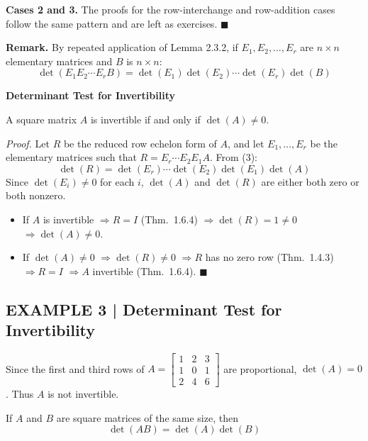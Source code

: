 \documentclass{article}
\newcommand{\redheading}[1]{{\vspace{2mm}\noindent\Large\bfseries\color{red!55!black} #1\par}\vspace{2mm}}
\theoremstyle{mystyle}
\begin{document}
\textbf{Cases 2 and 3.} The proofs for the row-interchange and row-addition cases
follow the same pattern and are left as exercises. $\blacksquare$

\textbf{Remark.} By repeated application of Lemma 2.3.2, if $E_1,E_2,\ldots,E_r$
are $n\times n$ elementary matrices and $B$ is $n\times n$:
\begin{equation}
\det(E_1 E_2\cdots E_r B)=\det(E_1)\det(E_2)\cdots\det(E_r)\det(B) \tag{3}
\end{equation}

\redheading{Determinant Test for Invertibility}

\begin{tcolorbox}[colback=red!4, colframe=red!60!black,
  title={\textbf{Theorem 2.3.3}}, boxrule=0.5mm, arc=3mm]
A square matrix $A$ is invertible if and only if $\det(A)\neq 0$.
\end{tcolorbox}

\textit{Proof.} Let $R$ be the reduced row echelon form of $A$, and let
$E_1,\ldots,E_r$ be the elementary matrices such that $R=E_r\cdots E_2 E_1 A$.
From (3):
\begin{equation}
\det(R)=\det(E_r)\cdots\det(E_2)\det(E_1)\det(A) \tag{4}
\end{equation}
Since $\det(E_i)\neq 0$ for each $i$, $\det(A)$ and $\det(R)$ are either both zero or
both nonzero.

\begin{itemize}
  \item If $A$ is invertible $\Rightarrow R=I$ (Thm.\ 1.6.4) $\Rightarrow \det(R)=1\neq 0$
    $\Rightarrow \det(A)\neq 0$.
  \item If $\det(A)\neq 0$ $\Rightarrow \det(R)\neq 0$ $\Rightarrow R$ has no zero row
    (Thm.\ 1.4.3) $\Rightarrow R=I$ $\Rightarrow A$ invertible (Thm.\ 1.6.4). $\blacksquare$
\end{itemize}

\subsection*{EXAMPLE 3 | Determinant Test for Invertibility}

Since the first and third rows of $A=\begin{bmatrix}1&2&3\\1&0&1\\2&4&6\end{bmatrix}$
are proportional, $\det(A)=0$. Thus $A$ is not invertible.

\begin{tcolorbox}[colback=red!4, colframe=red!60!black,
  title={\textbf{Theorem 2.3.4}}, boxrule=0.5mm, arc=3mm]
If $A$ and $B$ are square matrices of the same size, then
\[
\det(AB)=\det(A)\det(B)
\]
\end{tcolorbox}
\end{document}
